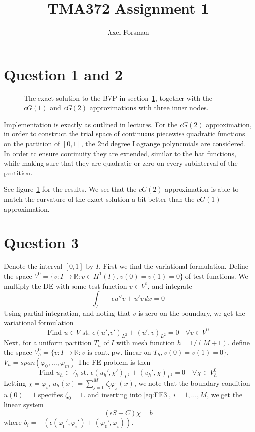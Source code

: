 \documentclass{article}
\author{Axel Forsman}
\title{TMA372 Assignment 1}
\begin{document}
\maketitle

\section{Question 1 and 2}\label{sec:question1}

\begin{figure}
  \begin{center}
  
  \end{center}
  \caption{The exact solution to the BVP in section~\ref{sec:question1},
    together with the $cG(1)$ and $cG(2)$ approximations
    with three inner nodes. \label{fig:1-2-cG-bvp}}
\end{figure}

Implementation is exactly as outlined in lectures.
For the $cG(2)$ approximation, in order to construct the
trial space of continuous piecewise quadratic functions on the partition of $[0,1]$,
the 2nd degree Lagrange polynomials are considered.
In order to ensure continuity they are extended,
similar to the hat functions,
while making sure that they are quadratic or zero on every subinterval of the partition.

See figure~\ref{fig:1-2-cG-bvp} for the results.
We see that the $cG(2)$ approximation is able to
match the curvature of the exact solution
a bit better than the $cG(1)$ approximation.

\section{Question 3}\label{sec:question3}

Denote the interval $[0, 1]$ by $I$.
First we find the variational formulation.
Define the space $V^0 = \{ v : I \to \mathbb R : v \in H^1(I), v(0) = v(1) = 0 \}$
of test functions.
We multiply the DE with some test function $v \in V^0$, and integrate
$$ \int_I -\epsilon u'' v + u' v \, dx = 0 $$
Using partial integration, and noting that $v$ is zero on the boundary,
we get the variational formulation
\begin{equation*}
  \text{Find $u \in V$ st. } \epsilon (u', v')_{L^2} + (u', v)_{L^2} = 0
  \quad \forall v \in V^0 \tag{VF3}
\end{equation*}
Next, for a uniform partition $T_h$ of $I$ with mesh function $h = 1 / (M + 1)$,
define the space
$V_h^0 = \{ v : I \to \mathbb R : v \text{ is cont. pw. linear on } T_h, v(0) = v(1) = 0 \}$,
$V_h = span(\varphi_0, \ldots, \varphi_m)$
The FE problem is then
\begin{equation*}\label{eq:FE3}
  \text{Find $u_h \in V_h$ st. } \epsilon (u_h', \chi')_{L^2} + (u_h', \chi)_{L^2} = 0
  \quad \forall \chi \in V_h^0 \tag{FE3}
\end{equation*}
Letting $\chi = \varphi_i$, $u_h(x) = \sum_{j=0}^M \zeta_j \varphi_j(x)$,
we note that the boundary condition $u(0) = 1$ specifies $\zeta_0 = 1$.
and inserting into \eqref{eq:FE3}, $i = 1,\ldots,M$, we get the linear system
$$ (\epsilon S + C) \chi = b $$
where $b_i = -(\epsilon (\varphi_0', \varphi_i') + (\varphi_0', \varphi_i))$.
\end{document}
